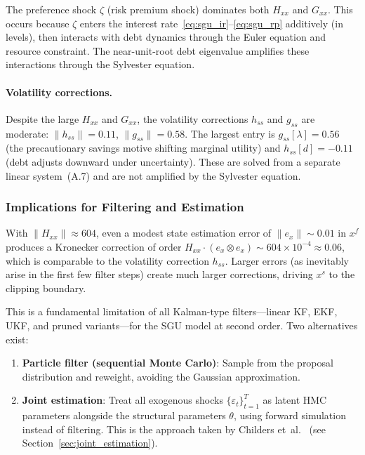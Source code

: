 \documentclass[11pt,a4paper]{article}
\theoremstyle{definition}
\begin{document}
	The preference shock $\zeta$ (risk premium shock) dominates both $H_{xx}$ and $G_{xx}$.
	This occurs because $\zeta$ enters the interest rate~\eqref{eq:sgu_ir}--\eqref{eq:sgu_rp} additively (in levels), then interacts with debt dynamics through the Euler equation and resource constraint.
	The near-unit-root debt eigenvalue amplifies these interactions through the Sylvester equation.

	\paragraph{Volatility corrections.}
	Despite the large $H_{xx}$ and $G_{xx}$, the volatility corrections $h_{ss}$ and $g_{ss}$ are moderate:
	$\|h_{ss}\| = 0.11$, $\|g_{ss}\| = 0.58$.
	The largest entry is $g_{ss}[\lambda] = 0.56$ (the precautionary savings motive shifting marginal utility) and $h_{ss}[d] = -0.11$ (debt adjusts downward under uncertainty).
	These are solved from a separate linear system~(A.7) and are not amplified by the Sylvester equation.

	\subsubsection{Implications for Filtering and Estimation}
	\label{sec:sgu_estimation_implications}

	With $\|H_{xx}\| \approx 604$, even a modest state estimation error of $\|e_x\| \sim 0.01$ in $x^f$ produces a Kronecker correction of order $H_{xx} \cdot (e_x \otimes e_x) \sim 604 \times 10^{-4} \approx 0.06$, which is comparable to the volatility correction $h_{ss}$.
	Larger errors (as inevitably arise in the first few filter steps) create much larger corrections, driving $x^s$ to the clipping boundary.

	This is a fundamental limitation of all Kalman-type filters---linear KF, EKF, UKF, and pruned variants---for the SGU model at second order.
	Two alternatives exist:

	\begin{enumerate}
		\item \textbf{Particle filter (sequential Monte Carlo)}: Sample from the proposal distribution and reweight, avoiding the Gaussian approximation.
		\item \textbf{Joint estimation}: Treat all exogenous shocks $\{\varepsilon_t\}_{t=1}^T$ as latent HMC parameters alongside the structural parameters $\theta$, using forward simulation instead of filtering.
		This is the approach taken by Childers et~al.~\cite{childers2024} (see Section~\ref{sec:joint_estimation}).
	\end{enumerate}
\end{document}
